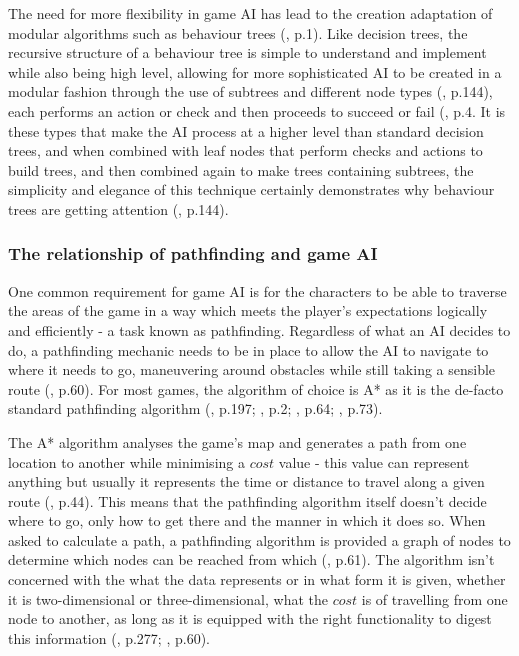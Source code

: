 \documentclass[11pt, a4paper]{article}
\begin{document}
The need for more flexibility in game AI has lead to the creation adaptation of modular algorithms such as behaviour trees (\cite{lim2010evolving}, p.1). Like decision trees, the recursive structure of a behaviour tree is simple to understand and implement while also being high level, allowing for more sophisticated AI to be created in a modular fashion through the use of subtrees and different node types (\cite{shoulson2011parameterizing}, p.144), each performs an action or check and then proceeds to succeed or fail (\cite{lim2010evolving}, p.4. It is these types that make the AI process at a higher level than standard decision trees, and when combined with leaf nodes that perform checks and actions to build trees, and then combined again to make trees containing subtrees, the simplicity and elegance of this technique certainly demonstrates why behaviour trees are getting attention (\cite{shoulson2011parameterizing}, p.144).

\subsubsection{The relationship of pathfinding and game AI}

One common requirement for game AI is for the characters to be able to traverse the areas of the game in a way which meets the player's expectations logically and efficiently - a task known as pathfinding. Regardless of what an AI decides to do, a pathfinding mechanic needs to be in place to allow the AI to navigate to where it needs to go, maneuvering around obstacles while still taking a sensible route (\cite{graham2003pathfinding}, p.60). For most games, the algorithm of choice is A* as it is the de-facto standard pathfinding algorithm (\cite{millington2019ai}, p.197; \cite{botea2004near}, p.2; \cite{nareyek2004ai}, p.64; \cite{leigh2007using}, p.73).

The A* algorithm analyses the game's map and generates a path from one location to another while minimising a $cost$ value - this value can represent anything but usually it represents the time or distance to travel along a given route (\cite{yap2002grid}, p.44). This means that the pathfinding algorithm itself doesn't decide where to go, only how to get there and the manner in which it does so. When asked to calculate a path, a pathfinding algorithm is provided a graph of nodes to determine which nodes can be reached from which (\cite{nareyek2004ai}, p.61). The algorithm isn't concerned with the what the data represents or in what form it is given, whether it is two-dimensional or three-dimensional, what the $cost$ is of travelling from one node to another, as long as it is equipped with the right functionality to digest this information (\cite{millington2019ai}, p.277; \cite{graham2003pathfinding}, p.60).
\end{document}
